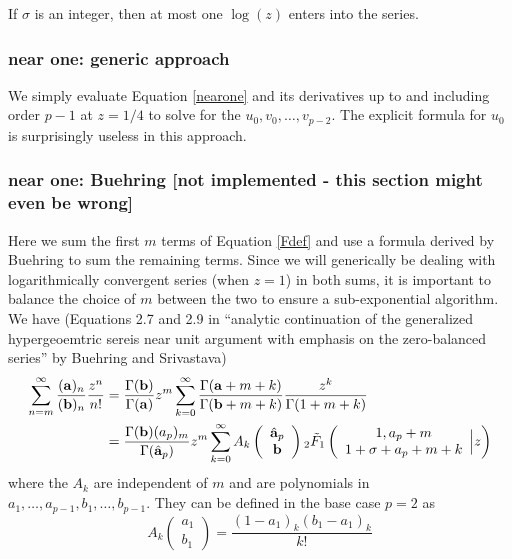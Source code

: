 \documentclass[10pt]{article}
\begin{document}
If $\sigma$ is an integer, then at most one $\log(z)$ enters into the series.
\subsubsection{near one: generic approach}
We simply evaluate Equation \eqref{nearone} and its derivatives up to and including order $p-1$ at $z=1/4$ to solve for the $u_0,v_0,\dots,v_{p-2}$. The explicit formula for $u_0$ is surprisingly useless in this approach.

\subsubsection{near one: Buehring [not implemented - this section might even be wrong]}
Here we sum the first $m$ terms of Equation \eqref{Fdef} and use a formula derived by Buehring to sum the remaining terms. Since we will generically be dealing with logarithmically convergent series (when $z=1$) in both sums, it is important to balance the choice of $m$ between the two to ensure a sub-exponential algorithm.
We have (Equations 2.7 and 2.9 in ``analytic continuation of the generalized hypergeoemtric sereis near unit argument with emphasis on the zero-balanced series'' by Buehring and Srivastava)
\begin{align*}
\sum_{n=m}^{\infty}{\frac{(\bold{a})_n}{(\bold{b})_n} \frac{z^n}{n!}}&=\frac{\Gamma(\bold{b})}{\Gamma(\bold{a})} z^m \sum_{k=0}^{\infty} {\frac{\Gamma(\bold{a}+m+k)}{\Gamma(\bold{b}+m+k)} \frac{z^k}{\Gamma(1+m+k)}}\\
&=\frac{\Gamma(\bold{b})(a_p)_m}{\Gamma(\hat{\bold{a}}_p)} z^m \sum_{k=0}^{\infty} {A_k\left(\begin{array}{c} \hat{\bold{a}}_p \\ \bold{b} \end{array}\right)} \, _2\tilde{F}_1\left( \begin{array}{c} 1,a_p+m \\ 1+\sigma+a_p+m+k \end{array} \Big| z\right)
\end{align*}
where the $A_k$ are independent of $m$ and are polynomials in $a_1,\dots,a_{p-1},b_1,\dots,b_{p-1}$. They can be defined in the base case $p=2$ as
\begin{equation*}
A_k\left(\begin{array}{c} a_1 \\ b_1 \end{array}\right) = \frac{(1-a_1)_k(b_1-a_1)_k}{k!}
\end{equation*}
\end{document}
